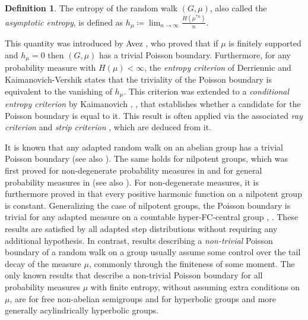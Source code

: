 \documentclass[reqno,oneside,11pt]{amsart}
\theoremstyle{plain}
\theoremstyle{definition}
\newtheorem{defn}[thm]{Definition} %
\begin{document}
\begin{defn}\label{defn: asymptotic entropy} The entropy of the random walk $(G,\mu)$, also called the \emph{asymptotic entropy}, is defined as
	\(h_{\mu}\coloneqq\lim_{n\to \infty} \frac{H(\mu^{*n})}{n}.\)
\end{defn}
This quantity was introduced by Avez \cite{Avez1972}, who proved that if $\mu$ is finitely supported and $h_\mu=0$ then $(G,\mu)$ has a trivial Poisson boundary. Furthermore, for any probability measure with $H(\mu)<\infty$, the \emph{entropy criterion} of Derriennic \cite{Derrienic1980} and Kaimanovich-Vershik \cite{KaimanovcihVershik1983} states that the triviality of the Poisson boundary is equivalent to the vanishing of $h_{\mu}$. This criterion was extended to a \emph{conditional entropy criterion} by Kaimanovich \cite[Theorem 2]{Kaimanovich1985conditional}, \cite[Theorem 4.6]{Kaimanovich2000}, that establishes whether a candidate for the Poisson boundary is equal to it. This result is often applied via the associated \emph{ray criterion} \cite[Theorem 5.5]{Kaimanovich2000} and \emph{strip criterion} \cite[Theorem 6.4]{Kaimanovich2000}, which are deduced from it.


It is known that any adapted random walk on an abelian group has a trivial Poisson boundary \cite{Blackwell1955} (see also \cite{ChoquetDeny1960,DoobSnellWilliamson1960}). The same holds for nilpotent groups, which was first proved for non-degenerate probability measures in \cite{DynkinMaljutov1961} and for general probability measures in \cite[Théorème IV.1]{Azencott1970} (see also \cite[Lemma 4.7]{Jaworski2004}). For non-degenerate measures, it is furthermore proved in \cite{Margulis1966} that every positive harmonic function on a nilpotent group is constant. Generalizing the case of nilpotent groups, the Poisson boundary is trivial for any adapted measure on a countable hyper-FC-central group \cite{LinZaidenberg1998,Jaworski2004}, \cite[Proposition 5.10]{ErschlerKaimanovich2023}. These results are satisfied by all adapted step distributions without requiring any additional hypothesis. In contrast, results describing a \emph{non-trivial} Poisson boundary of a random walk on a group usually assume some control over the tail decay of the measure $\mu$, commonly through the finiteness of some moment. The only known results that describe a non-trivial Poisson boundary for all probability measures $\mu$ with finite entropy, without assuming extra conditions on $\mu$, are \cite[Theorem 1.2]{ForghaniTiozzo2019} for free non-abelian semigroups and \cite{ChawlaForghaniFrischTiozzo2022} for hyperbolic groups and more generally acylindrically hyperbolic groups. 
\end{document}
